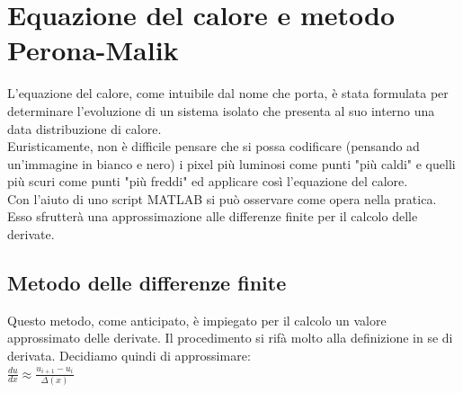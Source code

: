 \chapter{Equazione del calore e metodo Perona-Malik}
L'equazione del calore, come intuibile dal nome che porta, è stata formulata per determinare l'evoluzione di un sistema isolato che presenta al suo interno una data distribuzione di calore.\\
Euristicamente, non è difficile pensare che si possa codificare (pensando ad un'immagine in bianco e nero) i pixel più luminosi come punti "più caldi" e quelli più scuri come punti "più freddi" ed applicare così l'equazione del calore.\\
Con l'aiuto di uno script MATLAB si può osservare come opera nella pratica. Esso sfrutterà una approssimazione alle differenze finite per il calcolo delle derivate.\\
\section{Metodo delle differenze finite}
Questo metodo, come anticipato, è impiegato per il calcolo un valore approssimato delle derivate. Il procedimento si rifà molto alla definizione in se di derivata. Decidiamo quindi di approssimare:\\
\centering 
$\frac{du}{dx} \approx \frac{u_{i+1} - u_i}{\Delta(x)} $\\
~\\
~\\
~\\
~\\
~\\
~\\
~\\
~\\
~\\
~\\
~\\
~\\

